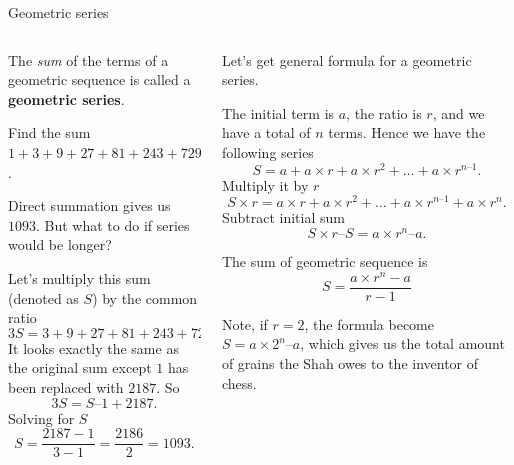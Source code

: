 \documentclass[9pt,aspectratio=169]{beamer}
\begin{document}
\begin{frame}{Geometric series}
  \begin{columns}[T]
    \begin{column}{0.5\textwidth}
      \begin{definition}
        The \emph{sum} of the terms of a geometric sequence is called a \textbf{geometric series}.
      \end{definition}
      \begin{problem}
        Find the sum $1 + 3 + 9 + 27 + 81 + 243 + 729$.
      \end{problem}

      Direct summation gives us $1093$. But what to do if series would be longer?

      Let’s multiply this sum (denoted as $S$) by the common ratio
      \[ 3S = 3 + 9 + 27 + 81 + 243 + 729 + 2187. \]
      It looks exactly the same as the original sum except $1$ has been replaced with $2187$.  So 
      \[ 3S = S – 1 + 2187. \]
      Solving for $S$
      \[ S = \frac{2187 - 1}{3 - 1} = \frac{2186}{2} = 1093. \]
    \end{column}
    \begin{column}{0.5\textwidth}
      Let’s get general formula for a geometric series.
      
      The initial term is $a$, the ratio is $r$, and we have a total of $n$ terms. Hence we have the following series
      \[ S = a + a \times r + a \times r^2 + \ldots + a \times r^{n–1}. \]Multiply it by $r$
      \[ S \times r = a \times r + a \times r^2 + \ldots + a \times r^{n–1} + a \times r^n. \]
      Subtract initial sum
      \[ S \times r – S = a \times r^n – a. \]
      \vspace*{-1em}
      \begin{definition}
        The sum of geometric sequence is
        \[ S = \frac{a \times r^n - a}{r - 1}\]
        \vspace*{-0.7em}
      \end{definition}
      Note, if $r = 2$, the formula become $S = a \times 2^n – a$, which gives us the total amount of grains the Shah owes to the inventor of chess.
    \end{column}
  \end{columns}
\end{frame}
\end{document}
